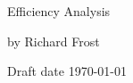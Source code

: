 
\vspace{10 em}
\begin{center}
\begin{Huge}
Efficiency Analysis
\end{Huge}
\end{center}

\vspace{1 em}
\begin{center}
\end{center}

\vspace{1 em}
\begin{center}
\begin{LARGE}
by Richard Frost

\vspace{1 em}
Draft date \today

\end{LARGE}
\end{center}

